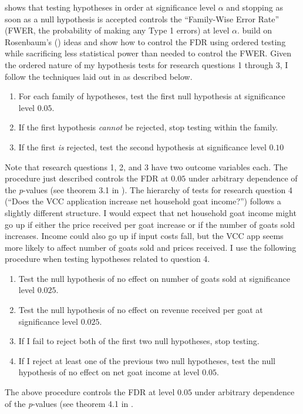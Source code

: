 \documentclass[11pt]{article}
\begin{document}
\citet{rosenbaum.08} shows that testing hypotheses in order at significance level $\alpha$ and stopping as soon as a null hypothesis is accepted controls the ``Family-Wise Error Rate'' (FWER, the probability of making any Type 1 errors) at level $\alpha$. \citet{lynch.17} build on Rosenbaum's (\citeyear{rosenbaum.08}) ideas and show how to control the FDR using ordered testing while sacrificing less statistical power than needed to control the FWER. Given the ordered nature of my hypothesis tests for research questions 1 through 3, I follow the techniques laid out in \citet{lynch.17} as described below. 
\begin{enumerate}
    \item For each family of hypotheses, test the first null hypothesis at significance level $0.05$.
    \item If the first hypothesis \textit{cannot} be rejected, stop testing within the family.
    \item If the first \textit{is} rejected, test the second hypothesis at significance level $0.10$
\end{enumerate}
Note that research questions 1, 2, and 3 have two outcome variables each. The procedure just described controls the FDR at $0.05$ under arbitrary dependence of the \textit{p}-values (see theorem 3.1 in \citet{lynch.17}).
The hierarchy of tests for research question 4 (``Does the VCC application increase net household goat income?'') follows a slightly different structure. I would expect that net household goat income might go up if either the price received per goat increase or if the number of goats sold increases. Income could also go up if input costs fall, but the VCC app seems more likely to affect number of goats sold and prices received. I use the following procedure when testing hypotheses related to question 4.

\begin{enumerate}
    \item Test the null hypothesis of no effect on number of goats sold at significance level $0.025$.
    \item Test the null hypothesis of no effect on revenue received per goat at significance level $0.025$.
    \item If I fail to reject both of the first two null hypotheses, stop testing.
    \item If I reject at least one of the previous two null hypotheses, test the null hypothesis of no effect on net goat income at level $0.05$.
\end{enumerate}
The above procedure controls the FDR at level $0.05$ under arbitrary dependence of the \textit{p}-values (see theorem 4.1 in \citet{lynch.17}.
\end{document}
